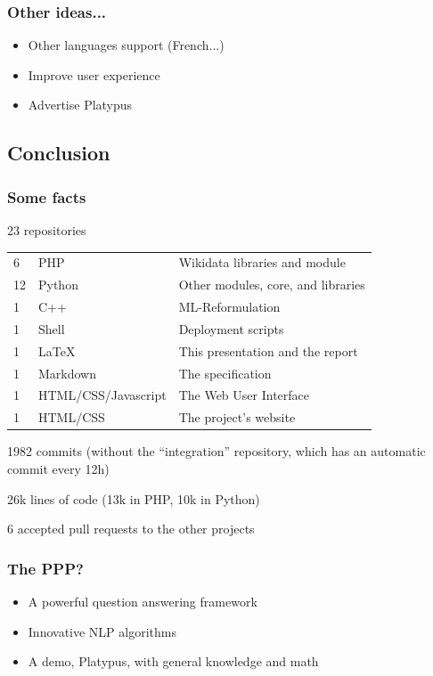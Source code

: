 \begin{frame}
    \frametitle{Other ideas...}

    \begin{itemize}
        \item Other languages support (French...)
        \item Improve user experience
        \item Advertise \alert{Platypus}
    \end{itemize}
\end{frame}

\subsection{Conclusion}

\begin{frame}
    \frametitle{Some facts} %
    \alert{23 repositories}

    \begin{tabular}{lll}
        6 & PHP & Wikidata libraries and module\\
        12 & Python & Other modules, core, and libraries\\
        1 & C++ & ML-Reformulation\\
        1 & Shell & Deployment scripts\\
        1 & \LaTeX & This presentation and the report\\
        1 & Markdown & The specification\\
        1 & HTML/CSS/Javascript & The Web User Interface\\
        1 & HTML/CSS & The project's website\\
    \end{tabular}

    \alert{1982 commits} (without the ``integration'' repository, which has an automatic commit every 12h)

    \alert{26k lines} of code (13k in PHP, 10k in Python)
    
    \alert{6} accepted pull requests to the other projects
\end{frame}

\begin{frame}
    \frametitle{The PPP?}

    \begin{itemize}
        \item A powerful question answering framework
        \item Innovative NLP algorithms
        \item A demo, \alert{Platypus}, with general knowledge and math
    \end{itemize}
\end{frame}


